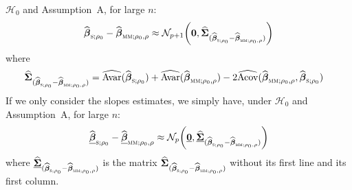 $\mathcal{H}_0$ and Assumption~A, for large $n$:
\[
    \sthat{\boldsymbol\beta}_{\stsc{S};\rho_0}
        - \sthat{\boldsymbol\beta}_{\stsc{MM};\rho_0,\rho}
    \approx \mathcal{N}_{p+1}\left(\stvec{0},
    \sthat{\boldsymbol\Sigma}_{(\sthat{\boldsymbol\beta}_{\stsc{S};\rho_0}
        - \sthat{\boldsymbol\beta}_{\stsc{MM};\rho_0,\rho})}
    \right)
\]
where
%
\begin{align}
    \label{eq:Hausman_sigmahat_S-MM}
    \sthat{\boldsymbol\Sigma}_{(\sthat{\boldsymbol\beta}_{\stsc{S};\rho_0}
        - \sthat{\boldsymbol\beta}_{\stsc{MM};\rho_0,\rho})} 
    &  = \sthat{\mathrm{Avar}}(\widehat{\boldsymbol\beta}_{\stsc{S};\rho_0})
       + \sthat{\mathrm{Avar}}(\sthat{\boldsymbol\beta}_{\stsc{MM};\rho_0,\rho})
     - 2 \sthat{\mathrm{Acov}}(\sthat{\boldsymbol\beta}_{\stsc{MM};\rho_0,\rho},
             \sthat{\boldsymbol\beta}_{\stsc{S};\rho_0})
\end{align}
%
If we only consider the slopes estimates, we simply have, under $\mathcal{H}_0$ 
and Assumption~A, for large $n$:
%
\begin{equation}
    \label{eq:Hausman_normality_S-MM}
    \sthat{\underline{\boldsymbol\beta}}_{\stsc{S};\rho_0}
        - \sthat{\underline{\boldsymbol\beta}}_{\stsc{MM};\rho_0,\rho}
    \approx \mathcal{N}_p\left(\underline{\stvec{0}},
    \sthat{\underline{\boldsymbol\Sigma}}_{(\sthat{\boldsymbol\beta}_{\stsc{S};\rho_0}
        - \sthat{\boldsymbol\beta}_{\stsc{MM};\rho_0,\rho})}
    \right)
\end{equation}
%
where
$\sthat{\underline{\boldsymbol\Sigma}}_{(\sthat{\boldsymbol\beta}_{\stsc{S};\rho_0} 
- \sthat{\boldsymbol\beta}_{\stsc{MM};\rho_0,\rho})}$ is the matrix
$\sthat{\boldsymbol\Sigma}_{(\sthat{\boldsymbol\beta}_{\stsc{S};\rho_0} -
\sthat{\boldsymbol\beta}_{\stsc{MM};\rho_0,\rho})}$ without its first line and
its first column.

